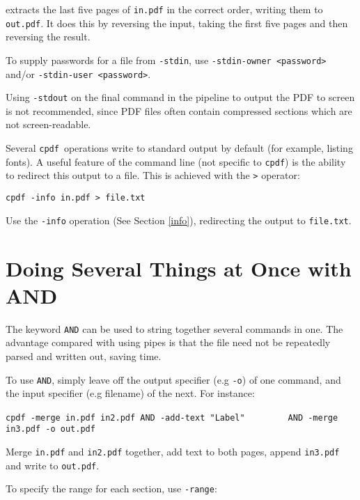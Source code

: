 \documentclass{book}
\newcommand{\cpdf}{\texttt{cpdf}}
\begin{document}
\noindent extracts the last five pages of \texttt{in.pdf} in the correct order,
writing them to \texttt{out.pdf}. It does this by reversing the input, taking
the first five pages and then reversing the result.

To supply passwords for a file from \texttt{-stdin}, use \texttt{-stdin-owner <password>} and/or \texttt{-stdin-user <password>}.

Using \texttt{-stdout} on the final command in the pipeline to output the PDF
to screen is not recommended, since PDF files often contain compressed sections
which are not screen-readable.

Several \cpdf\ operations write to standard output by default (for
example, listing fonts). A useful feature of the command line (not specific to
\cpdf) is the ability to redirect this output to a file. This is
achieved with the \texttt{>} operator:

\begin{framed}
  \small\verb!cpdf -info in.pdf > file.txt!

  \vspace{2.5mm}
  \noindent Use the \texttt{-info} operation (See Section \ref{info}), redirecting the
output to \texttt{file.txt}.
\end{framed}

\section{Doing Several Things at Once with AND}
The keyword \texttt{AND} can be used to string together several commands in
one. The advantage compared with using pipes is that the file need not be
repeatedly parsed and written out, saving time.

To use \texttt{AND}, simply leave off the output specifier (e.g \texttt{-o}) of
one command, and the input specifier (e.g filename) of the next. For instance:

\begin{framed}
  \small\verb!cpdf -merge in.pdf in2.pdf AND -add-text "Label"!
  \noindent\small\verb!        AND -merge in3.pdf -o out.pdf!

  \vspace{2.5mm}
  \noindent Merge \texttt{in.pdf} and \texttt{in2.pdf} together, add text to both pages, append \texttt{in3.pdf} and write to \texttt{out.pdf}.
\end{framed}

\noindent To specify the range for each section, use \texttt{-range}:
\end{document}
